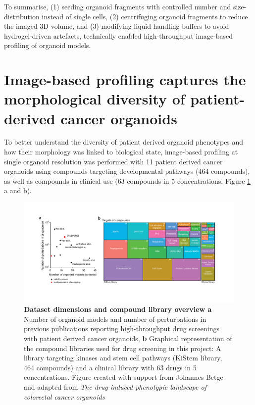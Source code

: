 \begin{flushleft}
\par
To summarise, (1) seeding organoid fragments with controlled number and size-distribution instead of single cells, (2) centrifuging organoid fragments to reduce the imaged 3D volume, and (3) modifying liquid handling buffers to avoid hydrogel-driven artefacts, technically enabled high-throughput image-based profiling of organoid models. 
\bigbreak

\newpage

\section{Image-based profiling captures the morphological diversity of patient-derived cancer organoids}

To better understand the diversity of patient derived organoid phenotypes and how their morphology was linked to biological state, image-based profiling at single organoid resolution was performed with 11 patient derived cancer organoids using compounds targeting developmental pathways (464 compounds), as well as compounds in clinical use (63 compounds in 5 concentrations, Figure \ref{fig_137} a and b). 

\begin{figure}[h]
\centering
\includegraphics[width=\textwidth,
                height=\textheight,
                keepaspectratio]{figures/promise/pdf/fig_1_3.pdf}
\caption[Dataset dimensions and compound library overview]{\textbf{Dataset dimensions and compound library overview a} Number of organoid models and number of perturbations in previous publications reporting high-throughput drug screenings with patient derived cancer organoids, \textbf{b} Graphical representation of the compound libraries used for drug screening in this project: A library targeting kinases and stem cell pathways (KiStem library, 464 compounds) and a clinical library with 63 drugs in 5 concentrations. Figure created with support from Johannes Betge and adapted from \textit{The drug-induced phenotypic landscape of colorectal cancer organoids} \parencite{betgeDruginducedPhenotypicLandscape2022}}
\label{fig_137}
\end{figure}


\end{flushleft}
